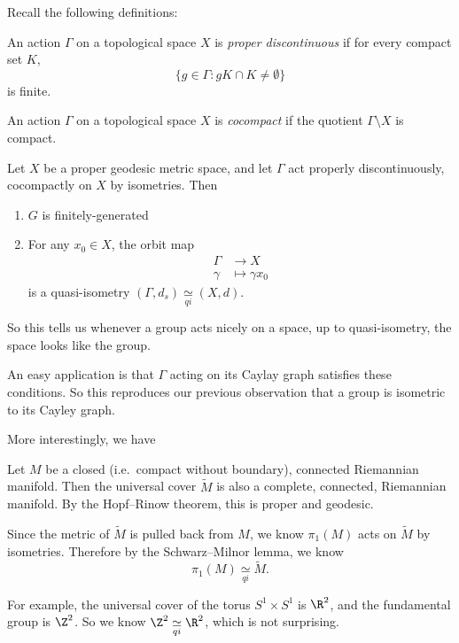 \documentclass[a4paper]{article}
\newcommand{\qi}{\underset{qi}{\simeq}}
\begin{document}
Recall the following definitions:
\begin{defi}
  An action $\Gamma$ on a topological space $X$ is \emph{proper discontinuous} if for every compact set $K$,
  \[
    \{g \in \Gamma: gK \cap K \not= \emptyset\}
  \]
  is finite.
\end{defi}

\begin{defi}
  An action $\Gamma$ on a topological space $X$ is \emph{cocompact} if the quotient $\Gamma \setminus X$ is compact.
\end{defi}

\begin{lemma}
  Let $X$ be a proper geodesic metric space, and let $\Gamma$ act properly discontinuously, cocompactly on $X$ by isometries. Then
  \begin{enumerate}
    \item $G$ is finitely-generated
    \item For any $x_0 \in X$, the orbit map
      \begin{align*}
        \Gamma &\to X\\
        \gamma &\mapsto \gamma x_0
      \end{align*}
      is a quasi-isometry $(\Gamma, d_s) \qi (X, d)$.
  \end{enumerate}
\end{lemma}
So this tells us whenever a group acts nicely on a space, up to quasi-isometry, the space looks like the group.

An easy application is that $\Gamma$ acting on its Caylay graph satisfies these conditions. So this reproduces our previous observation that a group is isometric to its Cayley graph.

More interestingly, we have
\begin{eg}
  Let $M$ be a closed (i.e.\ compact without boundary), connected Riemannian manifold. Then the universal cover $\tilde{M}$ is also a complete, connected, Riemannian manifold. By the Hopf--Rinow theorem, this is proper and geodesic.

  Since the metric of $\tilde{M}$ is pulled back from $M$, we know $\pi_1(M)$ acts on $\tilde{M}$ by isometries. Therefore by the Schwarz--Milnor lemma, we know
  \[
     \pi_1(M) \qi \tilde{M}.
  \]
\end{eg}
\begin{eg}
  For example, the universal cover of the torus $S^1 \times S^1$ is $\R^2$, and the fundamental group is $\Z^2$. So we know $\Z^2 \qi \R^2$, which is not surprising.
\end{eg}
\end{document}
